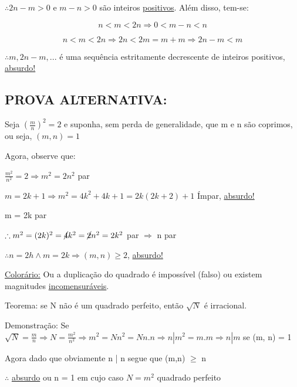 \documentclass[a4paper, 12pt]{article}
\begin{document}
\newpage
{$\therefore 2n-m > 0$ e $ m-n > 0$ são inteiros \underline{positivos}. Além disso, tem-se:}

\[n < m < 2n \Rightarrow 0 < m-n < n\]

\[n < m < 2n \Rightarrow 2n < 2m = m + m \Rightarrow 2n - m < m\]


{$\therefore m, 2n-m,...$ é uma sequência estritamente decrescente de inteiros positivos, \underline{absurdo!}}

\subsection{PROVA ALTERNATIVA:} 

{Seja $(\frac{m}{n})^2 = 2$ e suponha, sem perda de generalidade, que m e n são coprimos, ou seja, $(m,n)=1$}

Agora, observe que:

\begin{center}
$\frac{m^2}{n^2} = 2 \Rightarrow m^2 = 2n^2$ par 
\newline

$m = 2k + 1 \Rightarrow m^2 = 4k^2 + 4k + 1 = 2k(2k + 2) + 1$ Ímpar, \underline{absurdo!}

{m = 2k par}

$\therefore m^2 = (2k)^2 = \cancel{4}k^2 = \cancel{2}n^2 = 2k^2$ par $\Rightarrow$ n par
\newline

$\therefore n = 2h \wedge  m = 2k \Rightarrow (m,n) \ge 2$, \underline{absurdo!}
\newline
\end{center}

\underline{Colorário:} Ou a duplicação do quadrado é impossível (falso) ou existem magnitudes \underline{incomensuráveis}.
\newline

Teorema: se N não é um quadrado perfeito, então $\sqrt{N}$ é irracional.
\newline

Demonstração: Se $\sqrt{N} = \frac{m}{n} \Rightarrow N = \frac{m^2}{n^2} \Rightarrow m^2 = Nn^2 = Nn.n \Rightarrow n | m^2 = m.m \Rightarrow n | m$ se (m, n) = 1 
\newline

Agora dado que obviamente n | n segue que (m,n) $\ge$ n
\newline

$\therefore$ \underline{absurdo} ou n = 1 em cujo caso $N = m^2$ quadrado perfeito
\end{document}
